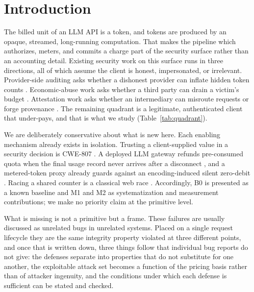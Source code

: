 \documentclass[preprint,3p,authoryear,12pt]{elsarticle}
\begin{document}
\section{Introduction}
The billed unit of an LLM API is a token, and tokens are produced by an opaque, streamed,
long-running computation. That makes the pipeline which authorizes, meters, and commits a
charge part of the security surface rather than an accounting detail. Existing security
work on this surface runs in three directions, all of which assume the client is honest,
impersonated, or irrelevant. Provider-side auditing asks whether a dishonest provider can
inflate hidden token counts \citep{coin,invisible,tokeninflation}. Economic-abuse work asks
whether a third party can drain a victim's budget \citep{dow,dowreview,owasp,llmjacking}.
Attestation work asks whether an intermediary can misroute requests or forge provenance
\citep{aex,gwprov}. The remaining quadrant is a legitimate, authenticated client that
under-pays, and that is what we study (Table~\ref{tab:quadrant}).

We are deliberately conservative about what is new here. Each enabling mechanism already
exists in isolation. Trusting a client-supplied value in a security decision is CWE-807
\citep{cwe807}. A deployed LLM gateway refunds pre-consumed quota when the final usage
record never arrives after a disconnect \citep{newapi5235}, and a metered-token proxy
already guards against an encoding-induced silent zero-debit \citep{aperture247}. Racing a
shared counter is a classical web race \citep{kettle}. Accordingly, B0 is presented as a
known baseline and M1 and M2 as systematization and measurement contributions; we make no
priority claim at the primitive level.

What is missing is not a primitive but a frame. These failures are usually discussed as
unrelated bugs in unrelated systems. Placed on a single request lifecycle they are the
same integrity property violated at three different points, and once that is written
down, three things follow that individual bug reports do not give: the defenses separate
into properties that do not substitute for one another, the exploitable attack set becomes
a function of the pricing basis rather than of attacker ingenuity, and the conditions
under which each defense is sufficient can be stated and checked.
\end{document}
